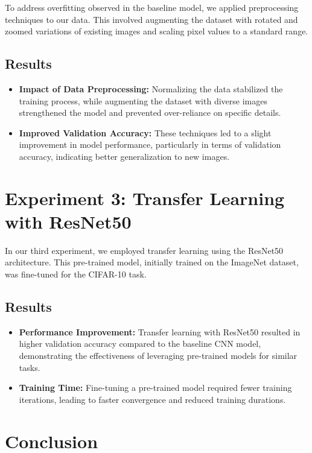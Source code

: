 \documentclass{article}
\begin{document}
To address overfitting observed in the baseline model, we applied preprocessing techniques to our data. This involved augmenting the dataset with rotated and zoomed variations of existing images and scaling pixel values to a standard range.

\subsection{Results}

\begin{itemize}
    \item \textbf{Impact of Data Preprocessing:} Normalizing the data stabilized the training process, while augmenting the dataset with diverse images strengthened the model and prevented over-reliance on specific details.
    \item \textbf{Improved Validation Accuracy:} These techniques led to a slight improvement in model performance, particularly in terms of validation accuracy, indicating better generalization to new images.
\end{itemize}

\section{Experiment 3: Transfer Learning with ResNet50}

In our third experiment, we employed transfer learning using the ResNet50 architecture. This pre-trained model, initially trained on the ImageNet dataset, was fine-tuned for the CIFAR-10 task.

\subsection{Results}

\begin{itemize}
    \item \textbf{Performance Improvement:} Transfer learning with ResNet50 resulted in higher validation accuracy compared to the baseline CNN model, demonstrating the effectiveness of leveraging pre-trained models for similar tasks.
    \item \textbf{Training Time:} Fine-tuning a pre-trained model required fewer training iterations, leading to faster convergence and reduced training durations.
\end{itemize}

\section{Conclusion}
\end{document}
